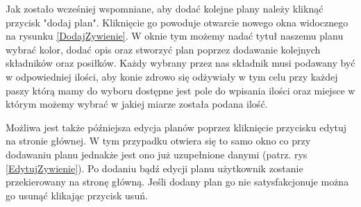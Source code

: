 \documentclass[12pt,oneside]{report}
\begin{document}
Jak zostało wcześniej wspomniane, aby dodać kolejne plany należy kliknąć przycisk "dodaj plan". Kliknięcie go powoduje otwarcie nowego okna widocznego na rysunku \ref{DodajZywienie}. W oknie tym możemy nadać tytuł naszemu planu wybrać kolor, dodać opis oraz stworzyć plan poprzez dodawanie kolejnych składników oraz posiłków.  Każdy wybrany przez nas składnik musi podawany być w odpowiedniej ilości, aby konie zdrowo się odżywiały w tym celu przy każdej paszy którą mamy do wyboru dostępne jest pole do wpisania ilości oraz miejsce w którym możemy wybrać w jakiej miarze została podana ilość. 

Możliwa jest także późniejsza edycja planów poprzez kliknięcie przycisku edytuj na stronie głównej. W tym przypadku otwiera się to samo okno co przy dodawaniu planu jednakże jest ono już uzupełnione danymi (patrz. rys \ref{EdytujZywienie}). Po dodaniu bądź edycji planu użytkownik zostanie przekierowany na stronę główną. Jeśli dodany plan go nie satysfakcjonuje można go usunąć klikając przycisk usuń.
\end{document}
